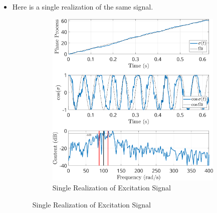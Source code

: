 \documentclass[11pt]{article}
\begin{document}
\begin{itemize}
\begin{figure}[htbp]
\caption{\label{avspec}Averaged excitation spectrum along with the theoretical spectrum}
\end{figure}
\item Here is a single realization of the same signal. 
\begin{figure}
\begin{figure}[htbp]
\centering
\includegraphics[width=.9\linewidth]{FIGS/B_NBsig.png}
\caption{Single Realization of Excitation Signal}
\end{figure}      
\label{real}
\end{figure}
\end{itemize}
\end{document}
